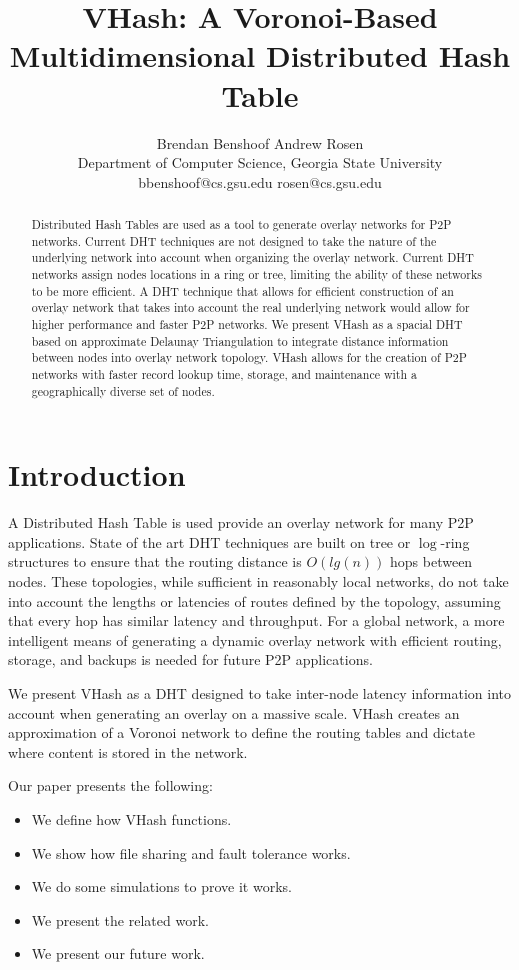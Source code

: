 \documentclass{IEEEtran}
\title{VHash: A Voronoi-Based Multidimensional Distributed Hash Table}
\author{Brendan Benshoof \qquad Andrew Rosen  \\Department of Computer Science, Georgia State University\\  bbenshoof@cs.gsu.edu \qquad rosen@cs.gsu.edu }
\date{} %
\begin{document}
\maketitle

\begin{abstract}
Distributed Hash Tables are used as a tool to generate overlay networks for P2P networks. Current DHT techniques are not designed to take the nature of the underlying network into account when organizing the overlay network. Current DHT networks assign nodes locations in a ring or tree, limiting the ability of these networks to be more efficient.
A DHT technique that allows for efficient construction of an overlay network that takes into account the real underlying network would allow for higher performance and faster P2P networks.
We present VHash as a spacial DHT based on approximate Delaunay Triangulation to integrate distance information between nodes into overlay network topology.
VHash allows for the creation of P2P networks with faster record lookup time, storage, and maintenance with a geographically diverse set of nodes.

\end{abstract}
\section{Introduction}
A Distributed Hash Table is used provide an overlay network for many P2P applications. State of the art DHT techniques are built on tree or $\log$-ring structures to ensure that the routing distance is $O(lg(n))$ hops between nodes. These topologies, while sufficient in reasonably local networks, do not take into account the lengths or latencies of routes defined by the topology, assuming that every hop has similar latency and throughput. For a global network, a more intelligent means of generating a dynamic overlay network with efficient routing, storage, and backups is needed for future P2P applications. 

We present VHash as a DHT designed to take inter-node latency information into account when generating an overlay on a massive scale.  VHash creates an approximation of a Voronoi network to define the routing tables and dictate where content is stored in the network. 

Our paper presents the following:
\begin{itemize}
	\item We define how VHash functions.
	\item We show how file sharing and fault tolerance works.
	\item We do some simulations to prove it works.
	\item We present the related work.
	\item We present our future work.
\end{itemize}
\end{document}
